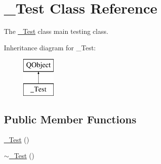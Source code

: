 \hypertarget{class__Test}{}\section{\+\_\+\+Test Class Reference}
\label{class__Test}


The \hyperlink{class__Test}{\+\_\+\+Test} class main testing class.  


Inheritance diagram for \+\_\+\+Test\+:\begin{figure}[H]
\begin{center}
\leavevmode
\includegraphics[height=2.000000cm]{class__Test}
\end{center}
\end{figure}
\subsection*{Public Member Functions}
\begin{DoxyCompactItemize}
\item 
\hyperlink{class__Test_a03ecfe4fd048c42338c5c54f73d830e2}{\+\_\+\+Test} ()
\item 
\hyperlink{class__Test_ac861d8bc0d139b86c2f30528d8c1bbbc}{$\sim$\+\_\+\+Test} ()
\end{DoxyCompactItemize}
